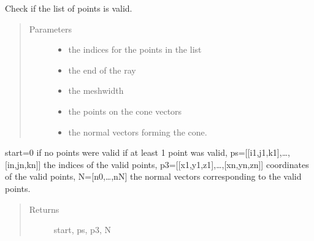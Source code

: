\documentclass[letterpaper,10pt,english]{sphinxmanual}
\begin{document}
\begin{fulllineitems}
\label{\detokenize{index:DictionarySparseMatrix.stopchecklist}}
Check if the list of points is valid.
\begin{quote}\begin{description}
\item[{Parameters}] \leavevmode\begin{itemize}
\item {} 
 \textendash{} the indices for the points in the list

\item {} 
 \textendash{} the end of the ray

\item {} 
 \textendash{} the meshwidth

\item {} 
 \textendash{} the points on the cone vectors

\item {} 
 \textendash{} the normal vectors forming the cone.

\end{itemize}

\end{description}\end{quote}

start=0 if no points were valid if at least 1 point was valid,
ps={[}{[}i1,j1,k1{]},…,{[}in,jn,kn{]}{]} the indices of the valid points,
p3={[}{[}x1,y1,z1{]},…,{[}xn,yn,zn{]}{]} co\sphinxhyphen{}ordinates of the valid points,
N={[}n0,…,nN{]} the normal vectors corresponding to the valid points.
\begin{quote}\begin{description}
\item[{Returns}] \leavevmode
start, ps, p3, N

\end{description}\end{quote}

\end{fulllineitems}

\end{document}
